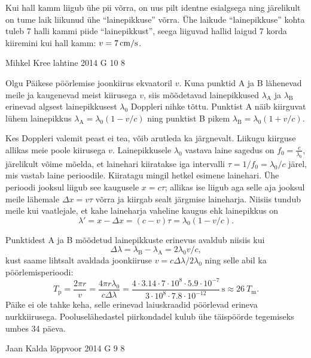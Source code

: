 \documentclass[11pt, twoside]{article}
\begin{document}
{{\ifSolution
Kui hall kamm liigub ühe pii võrra, on uus pilt identne esialgsega ning järelikult on tume laik liikunud ühe \enquote{lainepikkuse} võrra. 
Ühe laikude \enquote{lainepikkuse} kohta tuleb 7 halli kammi piide \enquote{lainepikkust}, seega liiguvad hallid laigud 7 korda kiiremini kui hall kamm: $v=\SI 7{cm/s}$.
\fi
}

{Mihkel Kree} %
{lahtine} %
{2014} %
{G 10} %
{8} %
{

\ifSolution
Olgu Päikese pöörlemise joonkiirus ekvaatoril $v$. Kuna punktid A ja B lähenevad meile ja kaugenevad meist kiirusega $v$, siis mõõdetavad lainepikkused $\lambda_\text{A}$ ja $\lambda_\text{B}$ erinevad algsest lainepikkusest $\lambda_0$ Doppleri nihke tõttu. Punktist A näib kiirguvat lühem lainepikkus $\lambda_\text{A}=\lambda_0(1-v/c)$ ning punktist B pikem $\lambda_\text{B}=\lambda_0(1+v/c)$.

Kes Doppleri valemit peast ei tea, võib arutleda ka järgnevalt. Liikugu kiirguse allikas meie poole kiirusega $v$. Lainepikkusele $\lambda_0$ vastava laine sagedus on $f_0=\frac{c}{\lambda_0}$, järelikult võime mõelda, et lainehari kiiratakse iga intervalli $\tau = 1/f_0 = \lambda_0/c$ järel, mis vastab laine perioodile. Kiiratagu mingil hetkel esimene lainehari. Ühe perioodi jooksul liigub see kaugusele $x=c\tau$; allikas ise liigub aga selle aja jooksul meile lähemale $\Delta x = v\tau$ võrra ja kiirgab sealt järgmise laineharja. Niisiis tundub meile kui vaatlejale, et kahe laineharja vaheline kaugus ehk lainepikkus on 
\[
\lambda'=x-\Delta x=(c-v)\tau = \lambda_0(1-v/c).
\]

Punktidest A ja B mõõdetud lainepikkuste erinevus avaldub niisiis kui 
\[
\Delta\lambda = \lambda_\text{B}-\lambda_\text{A} = 2\lambda_0 v/c,
\]
kust saame lihtsalt avaldada joonkiiruse $v=c\Delta\lambda/2\lambda_0$ ning selle abil ka pöörlemisperioodi:
\[
T_\text{p}=\frac{2\pi r}{v}=\frac{4 \pi r \lambda_0}{c\Delta \lambda}=
\frac{4 \cdot 3.14 \cdot 7\cdot 10^8 \cdot 5.9 \cdot 10^{-7}}{3\cdot 10^8\cdot 7.8\cdot 10^{-12}}\,\text{s}\approx \SI{26}{\textit{T}_\text{m}}.
\]
Päike ei ole tahke keha, selle erinevad laiuskraadid pöörlevad erineva nurkkiirusega. Pooluselähedastel piirkondadel kulub ühe täispöörde tegemiseks umbes 34 päeva.
\fi
}

{Jaan Kalda} %
{lõppvoor} %
{2014} %
{G 9} %
{8} %
{

}}
\end{document}
